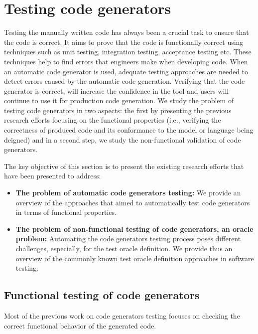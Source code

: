 \section{Testing code generators}
\label{sec:Testing code generators}
Testing the manually written code has always been a crucial task to ensure that the code is correct. It aims to prove that the code is functionally correct using techniques such as unit testing, integration testing, acceptance testing etc. These techniques help to find errors that engineers make when developing code.
When an automatic code generator is used, adequate testing approaches are needed to detect errors caused by the automatic code generation. Verifying that the code generator is correct, will increase the confidence in the tool and users will continue to use it for production code generation. 
We study the problem of testing code generators in two aspects: the first by presenting the previous research efforts focusing on the functional properties (i.e., verifying the correctness of produced code and its conformance to the model or language being deigned) and in a second step, we study the non-functional validation of code generators. 

The key objective of this section is to present the existing research efforts that have been presented to address:
\begin{itemize}
	\item \textbf{The problem of automatic code generators testing:}  We provide an overview of the approaches that aimed to automatically test code generators in terms of functional properties.
	
	\item \textbf{The problem of non-functional testing of code generators, an oracle problem:} Automating the code generators testing process poses different challenges, especially, for the test oracle definition. We provide thus an overview of the commonly known test oracle definition approaches in software testing. 
\end{itemize}

\subsection{Functional testing of code generators}
\label{sec: Functional testing of code generators}

Most of the previous work on code generators testing focuses on checking the correct functional behavior of the generated code\cite{stuermer2007systematic,zelenov2006automatic,conrad2009testing,conrad2010code,jorges2014back,burnard2004verifying,sturmer2003test}. 

